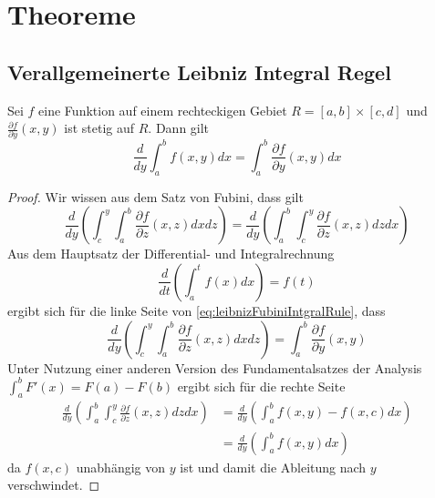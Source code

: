 \chapter{Theoreme}
\section{Verallgemeinerte Leibniz Integral Regel}
\begin{theorem}
\label{thm:leibnizIntegralRule}
Sei $f$ eine Funktion auf einem rechteckigen Gebiet $R=[a,b]\times [c,d]$ und $\frac{\partial f}{\partial y}(x,y)$ ist stetig auf $R$. Dann gilt
\begin{equation}
 \frac{d}{dy}\int_a^b f(x,y)dx = \int_a^b \frac{\partial f}{\partial y}(x,y)dx
\end{equation}
\begin{proof}
 Wir wissen aus dem Satz von Fubini, dass gilt
 \begin{equation}
 \label{eq:leibnizFubiniIntgralRule}
  \frac{d}{dy}\left( \int_c^y \int_a^b \frac{\partial f}{\partial z}(x,z) dx dz\right) = 
  \frac{d}{dy}\left( \int_a^b \int_c^y \frac{\partial f}{\partial z}(x,z) dz dx\right) 
 \end{equation}
Aus dem Hauptsatz der Differential- und Integralrechnung 
\[
 \frac{d}{dt}\left( \int_a^t f(x)dx\right) = f(t)
\]
ergibt sich für die linke Seite von \eqref{eq:leibnizFubiniIntgralRule}, dass
\[
 \frac{d}{dy}\left( \int_c^y \int_a^b \frac{\partial f}{\partial z}(x,z) dx dz\right)= \int_a^b\frac{\partial f}{\partial y}(x,y)
\]
Unter Nutzung einer anderen Version des Fundamentalsatzes der Analysis $\int_a^bF'(x) =F(a) - F(b)$ ergibt sich für die rechte Seite
\[
\begin{aligned}
  \frac{d}{dy}\left( \int_a^b \int_c^y \frac{\partial f}{\partial z}(x,z) dz dx\right) &= \frac{d}{dy} \left(\int_a^b f(x,y) - f(x,c)dx\right)\\
  &= \frac{d}{dy} \left(\int_a^b f(x,y)dx\right)
\end{aligned}
 \]
da $f(x,c)$ unabhängig von $y$ ist und damit die Ableitung nach $y$ verschwindet.
\end{proof}
\end{theorem}

